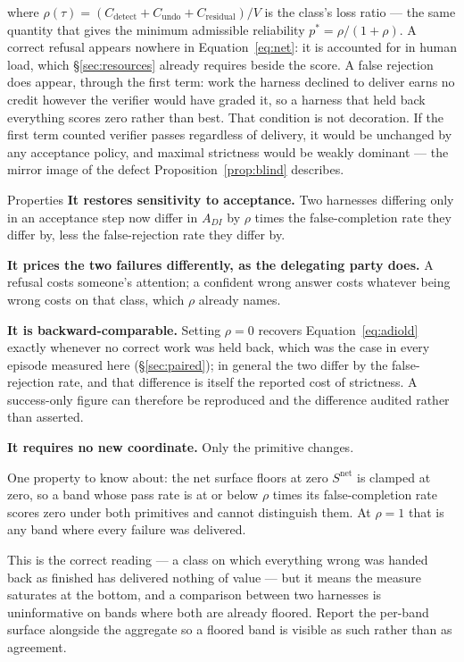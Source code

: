 \documentclass[11pt]{article}
\theoremstyle{definition}
\begin{document}
where $\rho(\tau) = (C_{\text{detect}} + C_{\text{undo}} + C_{\text{residual}})/V$ is the class's loss ratio --- the same quantity that gives the minimum admissible reliability $p^{*} = \rho/(1+\rho)$. A correct refusal appears nowhere in Equation~\eqref{eq:net}: it is accounted for in human load, which \S\ref{sec:resources} already requires beside the score. A false rejection does appear, through the first term: work the harness declined to deliver earns no credit however the verifier would have graded it, so a harness that held back everything scores zero rather than best. That condition is not decoration. If the first term counted verifier passes regardless of delivery, it would be unchanged by any acceptance policy, and maximal strictness would be weakly dominant --- the mirror image of the defect Proposition~\ref{prop:blind} describes.

\begin{claimbox}{Properties}
\textbf{It restores sensitivity to acceptance.} Two harnesses differing only in an acceptance step now differ in $A_{DI}$ by $\rho$ times the false-completion rate they differ by, less the false-rejection rate they differ by.

\textbf{It prices the two failures differently, as the delegating party does.} A refusal costs someone's attention; a confident wrong answer costs whatever being wrong costs on that class, which $\rho$ already names.

\textbf{It is backward-comparable.} Setting $\rho = 0$ recovers Equation~\eqref{eq:adiold} exactly whenever no correct work was held back, which was the case in every episode measured here (\S\ref{sec:paired}); in general the two differ by the false-rejection rate, and that difference is itself the reported cost of strictness. A success-only figure can therefore be reproduced and the difference audited rather than asserted.

\textbf{It requires no new coordinate.} Only the primitive changes.
\end{claimbox}

\begin{cautionbox}{One property to know about: the net surface floors at zero}
$S^{\text{net}}$ is clamped at zero, so a band whose pass rate is at or below
$\rho$ times its false-completion rate scores zero under both primitives and
cannot distinguish them. At $\rho = 1$ that is any band where every failure was
delivered.

This is the correct reading --- a class on which everything wrong was handed
back as finished has delivered nothing of value --- but it means the measure
saturates at the bottom, and a comparison between two harnesses is uninformative
on bands where both are already floored. Report the per-band surface alongside
the aggregate so a floored band is visible as such rather than as agreement.
\end{cautionbox}
\end{document}
